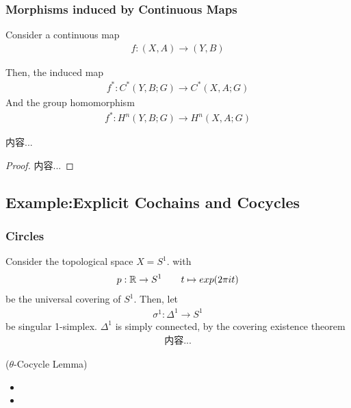 \documentclass[Total.tex]{subfiles}
\begin{document}
				\subsubsection{Morphisms induced by Continuous Maps}
				\begin{Def}
					Consider a continuous map
					\begin{gather*}
						f:(X,A)\rightarrow (Y,B)
					\end{gather*}
					
					Then, the induced map
					\begin{gather*}
						f^*:C^*(Y,B;G)\rightarrow C^*(X,A;G)
					\end{gather*}
					And the group homomorphism
					\begin{gather*}
						f^*:H^n(Y,B;G)\rightarrow H^n(X,A;G)
					\end{gather*}
				\end{Def}
				\begin{lemma}
					内容...
				\end{lemma}
				\begin{proof}
					内容...
				\end{proof}
					
					\subsection{Example:Explicit Cochains and Cocycles}
					\subsubsection{Circles}
						Consider the topological space $X=S^1$. with
						\begin{gather*}
							p:\mathbb{R}\rightarrow S^1\qquad t\mapsto exp(2\pi it)
						\end{gather*}
						be the universal covering of $S^1$. Then, let 
						\begin{gather*}
							\sigma^1:\Delta^1\rightarrow S^1
						\end{gather*}
						be singular 1-simplex. $\Delta^1$ is simply connected, by the covering existence theorem
						\begin{gather*}
							内容...
						\end{gather*}
						\begin{lemma}
							($\theta$-Cocycle Lemma) 
							\begin{itemize}
								\item 
								\item 
							\end{itemize}
						\end{lemma}
\end{document}
